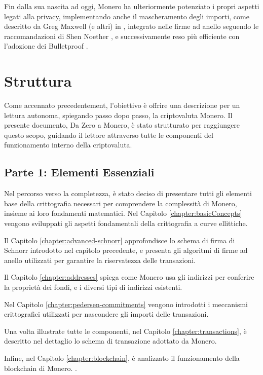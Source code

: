 Fin dalla sua nascita ad oggi, Monero ha ulteriormente potenziato i propri aspetti legati alla privacy, implementando anche il mascheramento degli importi, come descritto da Greg Maxwell (e altri) in \cite{Signatures2015BorromeanRS}, integrato nelle firme ad anello seguendo le raccomandazioni di Shen Noether \cite{MRL-0005-ringct}, e successivamente reso più efficiente con l’adozione dei Bulletproof \cite{Bulletproofs_paper}.



\section{Struttura}

Come accennato precedentement, l'obiettivo è offrire una descrizione per un lettura autonoma, spiegando passo dopo passo, la criptovaluta Monero. Il presente documento, Da Zero a Monero, è stato strutturato per raggiungere questo scopo, guidando il lettore attraverso tutte le componenti del funzionamento interno della criptovaluta.


\subsection{Parte 1: Elementi Essenziali}

Nel percorso verso la completezza, è stato deciso di presentare tutti gli elementi base della crittografia necessari per comprendere la complessità di Monero, insieme ai loro fondamenti matematici. Nel Capitolo \ref{chapter:basicConcepts} vengono sviluppati gli aspetti fondamentali della crittografia a curve ellittiche.

Il Capitolo \ref{chapter:advanced-schnorr} approfondisce lo schema di firma di Schnorr introdotto nel capitolo precedente, e presenta gli algoritmi di firme ad anello utilizzati per garantire la riservatezza delle transazioni.

Il Capitolo \ref{chapter:addresses} spiega come Monero usa gli indirizzi per conferire la proprietà dei fondi, e i diversi tipi di indirizzi esistenti.

Nel Capitolo \ref{chapter:pedersen-commitments} vengono introdotti i meccanismi crittografici utilizzati per nascondere gli importi delle transazioni.

Una volta illustrate tutte le componenti, nel Capitolo \ref{chapter:transactions}, è descritto nel dettaglio lo schema di transazione adottato da Monero.

Infine, nel Capitolo \ref{chapter:blockchain}, è analizzato il funzionamento della blockchain di Monero. .


